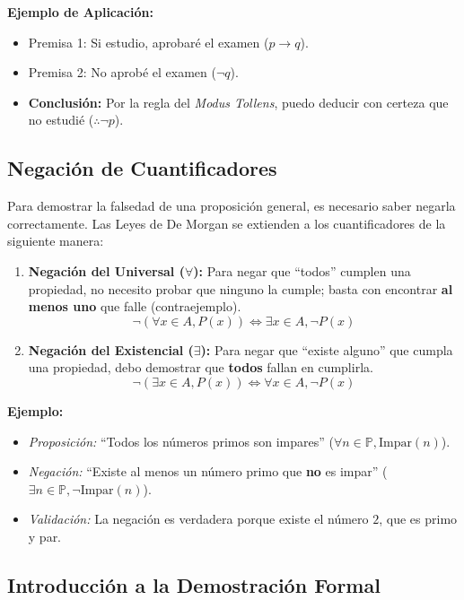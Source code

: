 \noindent \textbf{Ejemplo de Aplicación:}
\begin{itemize}
    \item Premisa 1: Si estudio, aprobaré el examen ($p \to q$).
    \item Premisa 2: No aprobé el examen ($\neg q$).
    \item \textbf{Conclusión:} Por la regla del \textit{Modus Tollens}, puedo deducir con certeza que no estudié ($\therefore \neg p$).
\end{itemize}

\subsection{Negación de Cuantificadores}

Para demostrar la falsedad de una proposición general, es necesario saber negarla correctamente. Las Leyes de De Morgan se extienden a los cuantificadores de la siguiente manera:

\begin{enumerate}
    \item \textbf{Negación del Universal ($\forall$):}
    Para negar que ``todos'' cumplen una propiedad, no necesito probar que ninguno la cumple; basta con encontrar \textbf{al menos uno} que falle (contraejemplo).
    \[ \neg (\forall x \in A, P(x)) \iff \exists x \in A, \neg P(x) \]

    \item \textbf{Negación del Existencial ($\exists$):}
    Para negar que ``existe alguno'' que cumpla una propiedad, debo demostrar que \textbf{todos} fallan en cumplirla.
    \[ \neg (\exists x \in A, P(x)) \iff \forall x \in A, \neg P(x) \]
\end{enumerate}

\noindent \textbf{Ejemplo:}
\begin{itemize}
    \item \textit{Proposición:} ``Todos los números primos son impares'' ($\forall n \in \mathbb{P}, \text{Impar}(n)$).
    \item \textit{Negación:} ``Existe al menos un número primo que \textbf{no} es impar'' ($\exists n \in \mathbb{P}, \neg \text{Impar}(n)$).
    \item \textit{Validación:} La negación es verdadera porque existe el número $2$, que es primo y par.
\end{itemize}

\subsection{Introducción a la Demostración Formal}

